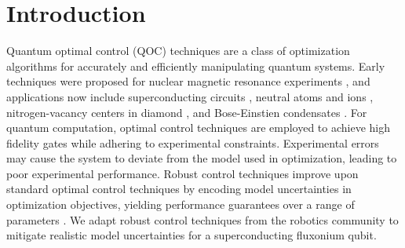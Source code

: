 \section{Introduction}
Quantum optimal control (QOC) techniques are a class of optimization
algorithms for accurately and efficiently manipulating quantum systems.
Early techniques were proposed for nuclear magnetic resonance experiments
\cite{vandersypen2005nmr, kehlet2004improving, khaneja2005optimal,
  maximov2008optimal, nielsen2010optimal, skinner2003application, tosner2009optimal},
and applications now include superconducting circuits \cite{abdelhafez2020universal,
  chakram2020multimode, fisher2010optimal, gokhale2019partial,
  huang2020engineering, leng2019robust, leung2017speedup, li2020fast,
  xu2020nonadiabatic},
neutral atoms and ions \cite{brouzos2015quantum,
  de2008optimal, goerz2011quantum, guo2019high, jensen2019time,
  larrouy2020fast, omran2019generation, rosi2013fast, sorensen2019qengine,
  treutlein2006microwave, van2016optimal},
nitrogen-vacancy centers in diamond \cite{chou2015optimal,
  dolde2014high, geng2016experimental,
  nobauer2015smooth, poggiali2018optimal, rembold2020introduction, tian2019optimal},
and Bose-Einstien condensates \cite{amri2019optimal, sorensen2018quantum}.
For quantum computation,
optimal control techniques are employed to achieve high fidelity gates
while adhering to experimental constraints.
Experimental errors may cause the system to deviate
from the model used in optimization, leading
to poor experimental performance.
Robust control techniques improve upon
standard optimal control techniques by encoding
model uncertainties
in optimization objectives, yielding performance
guarantees over a range of parameters \cite{Zhou97,Morimoto00,Manchester18}.
We adapt robust control techniques from the robotics community to mitigate
realistic model uncertainties for
a superconducting fluxonium qubit.

